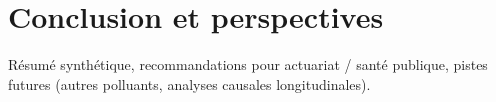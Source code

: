\chapter{Conclusion et perspectives}
\label{chap:conclusion}
Résumé synthétique, recommandations pour actuariat / santé publique, pistes futures (autres polluants, analyses causales longitudinales).


%